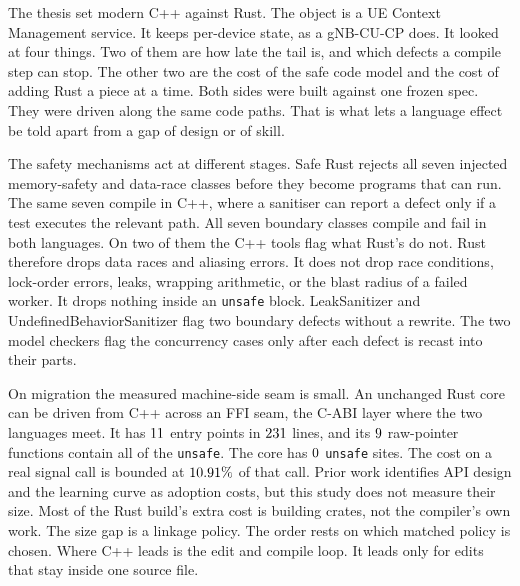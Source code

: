 \documentclass[english,oneside,a4paper,censored,csm,software-track-2020]{HYthesisML}
\begin{document}
The thesis set modern C++ against Rust. The object is a UE Context Management
service. It keeps per-device state, as a gNB-CU-CP does. It looked at four things. Two of them are
how late the tail is, and which defects a compile step can stop. The other two are the
cost of the safe code model and the cost of adding Rust a piece at a time. Both
sides were built against one frozen spec. They were driven along the same code
paths. That is what lets a language effect be told apart from a gap of design or
of skill.

The safety mechanisms act at different stages. Safe Rust rejects all seven
injected memory-safety and data-race classes before they become programs that
can run. The same seven compile in C++, where a sanitiser can report a defect
only if a test executes the relevant path. All seven boundary classes compile
and fail in both languages. On two of them the C++ tools flag what Rust's do
not. Rust therefore drops data races and aliasing errors. It does not drop
race conditions, lock-order errors, leaks, wrapping arithmetic, or the blast
radius of a failed worker. It drops nothing inside an \texttt{unsafe} block.
LeakSanitizer and UndefinedBehaviorSanitizer flag two boundary defects without
a rewrite. The two model checkers flag the concurrency cases only after each
defect is recast into their parts.

On migration the measured machine-side seam is small. An unchanged Rust core
can be driven from C++ across an FFI
seam, the C-ABI layer where the two languages meet. It has
$11$ entry points in $231$ lines, and its
$9$ raw-pointer functions contain all of the \texttt{unsafe}. The
core has $0$ \texttt{unsafe} sites. The cost on a real signal call is
bounded at $10.91\%$ of that call.
Prior work identifies API design and the learning curve as adoption costs, but
this study does not measure their size.
Most of the Rust build's extra cost is building crates, not the
compiler's own work. The size gap is a linkage policy. The order
rests on which matched policy is chosen. Where C++ leads is the edit and compile
loop. It leads only for edits that stay inside one source file.
\end{document}
